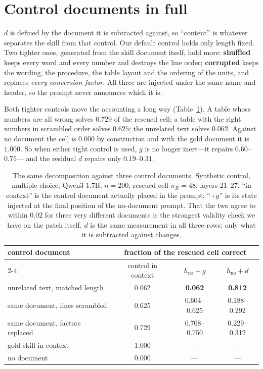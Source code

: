 \documentclass{article}
\newcommand{\dvec}{\ensuremath{d}}
\newcommand{\gvec}{\ensuremath{g}}
\begin{document}
\section{Control documents in full}
\label{app:controls}

$\dvec$ is defined by the document it is subtracted against, so ``content'' is
whatever separates the skill from that control. Our default control holds only
length fixed. Two tighter ones, generated from the skill document itself, hold
more: \textbf{shuffled} keeps every word and every number and destroys the line
order; \textbf{corrupted} keeps the wording, the procedure, the table layout and
the ordering of the units, and replaces \emph{every conversion factor}. All
three are injected under the same name and header, so the prompt never announces
which it is.

Both tighter controls move the accounting a long way
(Table~\ref{tab:controls}). A table whose numbers are all wrong solves $0.729$
of the rescued cell; a table with the right numbers in scrambled order solves
$0.625$; the unrelated text solves $0.062$. Against no document the cell is
$0.000$ by construction and with the gold document it is $1.000$. So when either
tight control is used, $\gvec$ is no longer inert---it repairs $0.60$--$0.75$---
and the residual $\dvec$ repairs only $0.19$--$0.31$.

\begin{table}[t]
\caption{The same decomposition against three control documents. Synthetic
control, multiple choice, Qwen3-1.7B, $n=200$, rescued cell $n_R=48$, layers
21--27. ``in context'' is the control document actually placed in the prompt;
``$+\gvec$'' is its state injected at the final position of the no-document
prompt. That the two agree to within $0.02$ for three very different documents
is the strongest validity check we have on the patch itself. $\dvec$ is the
same measurement in all three rows; only what it is subtracted against changes.}
\label{tab:controls}
\centering
\small
\begin{tabular}{lccc}
\toprule
control document & \multicolumn{3}{c}{fraction of the rescued cell correct}\\
\cmidrule(lr){2-4}
 & control in context & $h_{\text{no}}+\gvec$ & $h_{\text{no}}+\dvec$ \\
\midrule
unrelated text, matched length      & 0.062 & \textbf{0.062} & \textbf{0.812} \\
same document, lines scrambled      & 0.625 & 0.604--0.625   & 0.188--0.292 \\
same document, factors replaced     & 0.729 & 0.708--0.750   & 0.229--0.312 \\
\midrule
gold skill in context & 1.000 & --- & --- \\
no document           & 0.000 & --- & --- \\
\bottomrule
\end{tabular}
\end{table}
\end{document}
